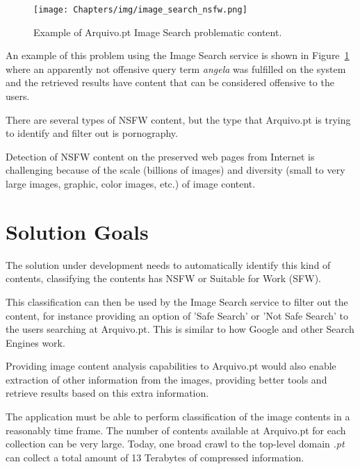 \begin{figure}
    \centering
    \texttt{[image: Chapters/img/image\_search\_nsfw.png]}
    \caption{Example of Arquivo.pt Image Search problematic content.}
    \label{fig:image_search_nsfw}
\end{figure}

An example of this problem using the Image Search service is shown in Figure~\ref{fig:image_search_nsfw} where an apparently not offensive query term \emph{angela} was fulfilled on the system and the retrieved results have content that can be considered offensive to the users.

There are several types of NSFW content, but the type that Arquivo.pt is trying to identify and filter out is pornography.

Detection of NSFW content on the preserved web pages from Internet is challenging because of the scale (billions of images) and diversity (small to very large images, graphic, color images, etc.) of image content.

\section{Solution Goals}

The solution under development needs to automatically identify this kind of contents, classifying the contents has NSFW or Suitable for Work (SFW).

This classification can then be used by the Image Search service to filter out the content, for instance providing an option of 'Safe Search' or 'Not Safe Search' to the users searching at Arquivo.pt. This is similar to how Google and other Search Engines work.

Providing image content analysis capabilities to Arquivo.pt would also enable extraction of other information from the images, providing better tools and retrieve results based on this extra information.

The application must be able to perform classification of the image contents in a reasonably time frame. The number of contents available at Arquivo.pt for each collection can be very large. Today, one broad crawl to the top-level domain \emph{.pt} can collect a total amount of 13 Terabytes of compressed information.

